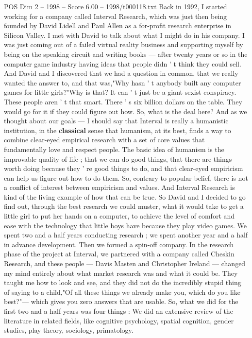 \begin{textsample}{POS Dim 2 – 1998 – Score 6.00 – 1998/t000118.txt}  \label{ex:f2_pos_065}
Back in 1992, I started working for a company called Interval Research, which was just then being founded by David Lidell and Paul Allen as a for-profit research enterprise in Silicon Valley.
I met with David to talk about what I might do in his company.
I was just coming out of a failed virtual reality business and supporting myself by being on the speaking circuit and writing books — after twenty years or so in the computer game industry having ideas that people didn ' t think they could sell.
And David and I discovered that we had a question in common, that we really wanted the answer to, and that was,"Why hasn ' t anybody built any computer games for little girls?"Why is that?
It can ' t just be a giant sexist conspiracy.
These people aren ' t that smart.
There ' s six billion dollars on the table.
They would go for it if they could figure out how.
So, what is the deal here?
And as we thought about our goals — I should say that Interval is really a humanistic institution, in the \textbf{classical} sense that humanism, at its best, finds a way to combine clear-eyed empirical research with a set of core values that fundamentally love and respect people.
The basic idea of humanism is the improvable quality of life ; that we can do good things, that there are things worth doing because they ' re good things to do, and that clear-eyed empiricism can help us figure out how to do them.
So, contrary to popular belief, there is not a conflict of interest between empiricism and values.
And Interval Research is kind of the living example of how that can be true.
So David and I decided to go find out, through the best research we could muster, what it would take to get a little girl to put her hands on a computer, to achieve the level of comfort and ease with the technology that little boys have because they play video games.
We spent two and a half years conducting research ; we spent another year and a half in advance development.
Then we formed a spin-off company.
In the research phase of the project at Interval, we partnered with a company called Cheskin Research, and these people — Davis Masten and Christopher Ireland — changed my mind entirely about what market research was and what it could be.
They taught me how to look and see, and they did not do the incredibly stupid thing of saying to a child,"Of all these things we already make you, which do you like best?"— which gives you zero answers that are usable.
So, what we did for the first two and a half years was four things : We did an extensive review of the literature in related fields, like cognitive psychology, spatial cognition, gender studies, play theory, sociology, primatology.

\end{textsample}
